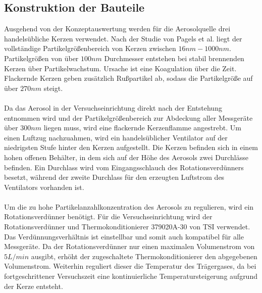 \subsection{Konstruktion der Bauteile}
Ausgehend von der Konzeptauswertung werden f\"{u}r die Aerosolquelle drei handels\"{u}bliche Kerzen verwendet. Nach der Studie von Pagels et al.\cite{candle} liegt der vollst\"{a}ndige Partikelgr\"{o}{\ss}enbereich von Kerzen zwischen \(16nm - 1000nm\). Partikelgr\"{o}{\ss}en von \"{u}ber \(100nm\) Durchmesser entstehen bei stabil brennenden Kerzen \"{u}ber Partikelwachstum. Ursache ist eine Koagulation \"{u}ber die Zeit. Flackernde Kerzen geben zus\"{a}tzlich Ru{\ss}partikel ab, sodass die Partikelgr\"{o}{\ss}e auf \"{u}ber \(270nm\) steigt.
\\\\
Da das Aerosol in der Versuchseinrichtung direkt nach der Entstehung entnommen wird und der Partikelgr\"{o}{\ss}enbereich zur Abdeckung aller Messger\"{a}te \"{u}ber \(300nm\) liegen muss, wird eine flackernde Kerzenflamme angestrebt. Um einen Luftzug nachzuahmen, wird ein handels\"{u}blicher Ventilator auf der niedrigsten Stufe hinter den Kerzen aufgestellt. Die Kerzen befinden sich in einem hohen offenen Beh\"{a}lter, in dem sich auf der H\"{o}he des Aerosols zwei Durchl\"{a}sse befinden. Ein Durchlass wird vom Eingangsschlauch des Rotationsverd\"{u}nners besetzt, w\"{a}hrend der zweite Durchlass f\"{u}r den erzeugten Luftstrom des Ventilators vorhanden ist.
\\\\
Um die zu hohe Partikelanzahlkonzentration des Aerosols zu regulieren, wird ein Rotationsverd\"{u}nner ben\"{o}tigt. F\"{u}r die Versuchseinrichtung wird der Rotationsverd\"{u}nner und Thermokonditionierer 379020A-30 von TSI verwendet. Das Verd\"{u}nnungsverh\"{a}ltnis ist einstellbar und somit auch kompatibel f\"{u}r alle Messger\"{a}te. Da der Rotationsverd\"{u}nner nur einen maximalen Volumenstrom von \(5L/min\) ausgibt, erh\"{o}ht der zugeschaltete Thermokonditionierer den abgegebenen Volumenstrom. Weiterhin reguliert dieser die Temperatur des Tr\"{a}gergases, da bei fortgeschrittener Versuchszeit eine kontinuierliche Temperatursteigerung aufgrund der Kerze entsteht.
\\\\
